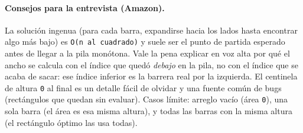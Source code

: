 \paragraph{Consejos para la entrevista (Amazon).} La solución ingenua
(para cada barra, expandirse hacia los lados hasta encontrar algo más bajo)
es \texttt{O(n al cuadrado)} y suele ser el punto de partida esperado antes
de llegar a la pila monótona. Vale la pena explicar en voz alta por qué el
ancho se calcula con el índice que quedó \emph{debajo} en la pila, no con el
índice que se acaba de sacar: ese índice inferior es la barrera real por la
izquierda. El centinela de altura \texttt{0} al final es un detalle fácil
de olvidar y una fuente común de bugs (rectángulos que quedan sin evaluar).
Casos límite: arreglo vacío (área \texttt{0}), una sola barra (el área es
esa misma altura), y todas las barras con la misma altura (el rectángulo
óptimo las usa todas).
